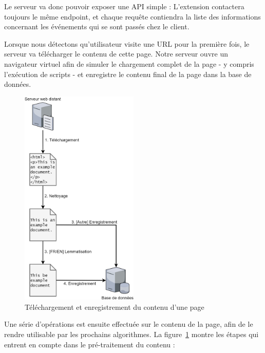 				Le serveur va donc pouvoir exposer une API simple : L'extension contactera toujours le même endpoint, et chaque requête contiendra la liste des informations concernant les événements qui se sont passés chez le client.

				Lorsque nous détectons qu'utilisateur visite une URL pour la première fois, le serveur va télécharger le contenu de cette page. Notre serveur ouvre un navigateur virtuel afin de simuler le chargement complet de la page - y compris l'exécution de scripts - et enregistre le contenu final de la page dans la base de données.

				\begin{figure}[!h]
					\centering
					\includegraphics[width=0.5\textwidth]{images/design/data1_big}
					\caption{Téléchargement et enregistrement du contenu d'une page}
					\label{d-download-page}
				\end{figure}

				Une série d'opérations est ensuite effectuée sur le contenu de la page, afin de le rendre utilisable par les prochains algorithmes. La figure~\ref{d-download-page} montre les étapes qui entrent en compte dans le pré-traitement du contenu :

